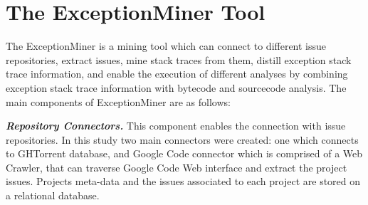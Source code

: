 \documentclass[conference]{IEEEtran}
\begin{document}


\section{The ExceptionMiner Tool}
\label{sec:exceptionminer}

The ExceptionMiner is a mining tool which can connect to different issue repositories, 
extract issues, mine stack traces from them, distill exception stack trace information,
and enable the execution of different analyses by combining exception stack 
trace information with bytecode and sourcecode analysis. The main components of ExceptionMiner are as follows:

\emph{\textbf{Repository Connectors.}} This component enables the connection 
with issue repositories. In this study two main connectors were created: one which connects to 
GHTorrent database, and Google Code connector which is comprised of a Web Crawler,
 that can traverse Google Code Web interface and extract the project issues. 
Projects meta-data and the issues associated to each project are stored on a relational 
database.
\end{document}
